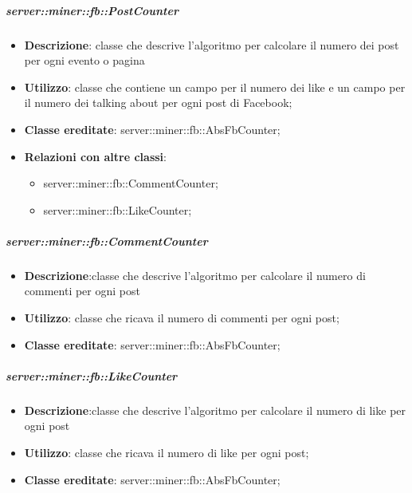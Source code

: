 	\subparagraph{server::miner::fb::PostCounter} %
		\label{subp:server_miner_fb_PostCounter}
			\begin{itemize}
				\item \textbf{Descrizione}: classe che descrive l'algoritmo per calcolare il numero dei post per ogni evento o pagina
				\item \textbf{Utilizzo}: classe che contiene un campo per il numero dei like e un campo per il numero dei talking about per ogni post di Facebook;
				\item \textbf{Classe ereditate}: server::miner::fb::AbsFbCounter;				
				\item \textbf{Relazioni con altre classi}:
					\begin{itemize}
						\item server::miner::fb::CommentCounter;
						\item server::miner::fb::LikeCounter;
					\end{itemize}
			\end{itemize}
	
	\subparagraph{server::miner::fb::CommentCounter} %
		\label{subp:server_miner_fb_CommentCounter}
			\begin{itemize}
				\item \textbf{Descrizione}:classe che descrive l'algoritmo per calcolare il numero di commenti per ogni post
				\item \textbf{Utilizzo}: classe che ricava il numero di commenti per ogni post;
				\item \textbf{Classe ereditate}: server::miner::fb::AbsFbCounter;
			\end{itemize}
	
	\subparagraph{server::miner::fb::LikeCounter} %
		\label{subp:server_miner_fb_LikeCounter}
			\begin{itemize}
					\item \textbf{Descrizione}:classe che descrive l'algoritmo per calcolare il numero di like per ogni post
				\item \textbf{Utilizzo}: classe che ricava il numero di like per ogni post;
				\item \textbf{Classe ereditate}: server::miner::fb::AbsFbCounter;
			\end{itemize}


